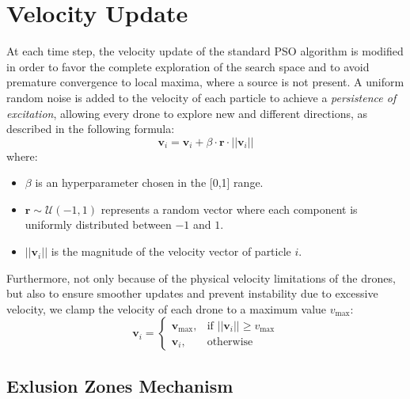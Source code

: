 \section{Velocity Update}
At each time step, the velocity update of the standard PSO algorithm is modified in order to favor the complete 
exploration of the search space and to avoid premature convergence to local maxima, where a source is not present. 
A uniform random noise is added to the velocity of each particle to achieve a \textit{persistence of excitation},
allowing every drone to explore new and different directions, 
as described in the following formula:
\[
\mathbf{v}_i = \mathbf{v}_i + \beta \cdot \mathbf{r} \cdot ||\mathbf{v}_i||
\]
where:
\begin{itemize}
    \item \(\beta\) is an hyperparameter chosen in the [0,1] range.
    \item \(\mathbf{r} \sim \mathcal{U}(-1, 1)\) represents a random vector where each component is uniformly distributed between \(-1\) and \(1\).
    \item \(||\mathbf{v}_i||\) is the magnitude of the velocity vector of particle \(i\).
\end{itemize}
Furthermore, not only because of the physical velocity limitations of the drones, but also to ensure smoother updates 
and prevent instability due to excessive velocity, we clamp the velocity of each drone 
to a maximum value \(v_{\text{max}}\):
\[
\mathbf{v}_i = 
\begin{cases} 
\mathbf{v}_{\text{max}}, & \text{if } ||\mathbf{v}_i|| \geq v_{\text{max}} \\
\mathbf{v}_i, & \text{otherwise}
\end{cases}
\]

\subsection{Exlusion Zones Mechanism}

